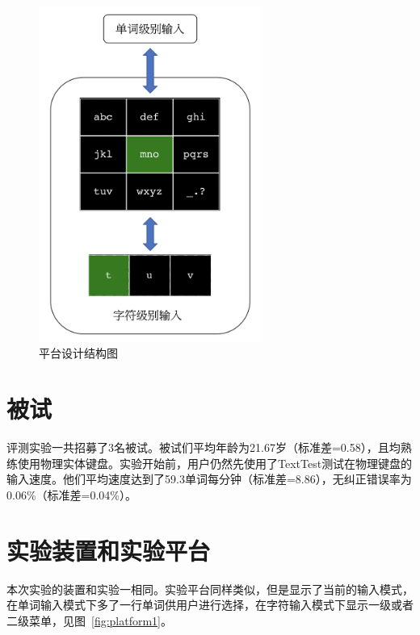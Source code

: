 \begin{figure}[htbp] %
    \centering
    \includegraphics[height=11cm]{figures/design.png}
    \caption{平台设计结构图}
    \label{fig:design}
\end{figure}

\section{被试}
评测实验一共招募了3名被试。被试们平均年龄为21.67岁（标准差=0.58），且均熟练使用物理实体键盘。实验开始前，用户仍然先使用了TextTest\cite{texttest}\cite{wobbrock2006analyzing}测试在物理键盘的输入速度。他们平均速度达到了59.3单词每分钟（标准差=8.86），无纠正错误率为0.06\%（标准差=0.04\%）。

\section{实验装置和实验平台}
本次实验的装置和实验一相同。实验平台同样类似，但是显示了当前的输入模式，在单词输入模式下多了一行单词供用户进行选择，在字符输入模式下显示一级或者二级菜单，见图~\ref{fig:platform1}。

